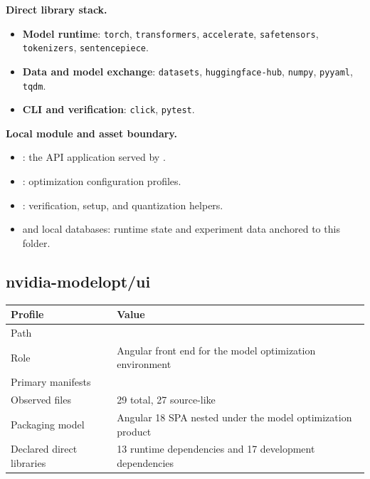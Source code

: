 \documentclass[11pt,a4paper]{article}
\begin{document}
\textbf{Direct library stack.}
\begin{itemize}[leftmargin=*]
    \item \textbf{Model runtime}: \texttt{torch}, \texttt{transformers}, \texttt{accelerate}, \texttt{safetensors}, \texttt{tokenizers}, \texttt{sentencepiece}.
    \item \textbf{Data and model exchange}: \texttt{datasets}, \texttt{huggingface-hub}, \texttt{numpy}, \texttt{pyyaml}, \texttt{tqdm}.
    \item \textbf{CLI and verification}: \texttt{click}, \texttt{pytest}.
\end{itemize}

\textbf{Local module and asset boundary.}
\begin{itemize}[leftmargin=*]
    \item {}: the API application served by .
    \item {}: optimization configuration profiles.
    \item {}: verification, setup, and quantization helpers.
    \item {} and local databases: runtime state and experiment data anchored to this folder.
\end{itemize}

\subsection{nvidia-modelopt/ui}

\begin{tabular}{@{}P{4.2cm}P{9.8cm}@{}}
\toprule
\textbf{Profile} & \textbf{Value} \\
\midrule
Path &  \\
Role & Angular front end for the model optimization environment \\
Primary manifests &  \\
Observed files & 29 total, 27 source-like \\
Packaging model & Angular 18 SPA nested under the model optimization product \\
Declared direct libraries & 13 runtime dependencies and 17 development dependencies \\
\bottomrule
\end{tabular}
\end{document}
